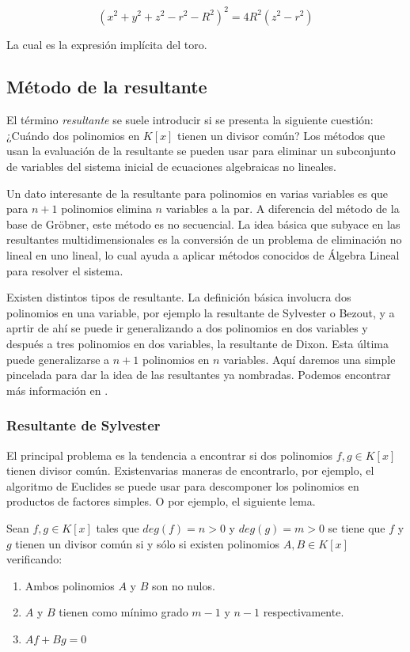 $$(x^2 + y^2 + z^2 - r^2 - R^2)^2 = 4 R^2 (z^2 - r^2)$$

La cual es la expresión implícita del toro.

\subsection{Método de la resultante}

El término { \em resultante} se suele introducir si se presenta la siguiente cuestión: ¿Cuándo dos polinomios en $K[x]$ tienen un divisor común? Los métodos que usan la evaluación de la resultante se pueden usar para eliminar un subconjunto de variables del sistema inicial de ecuaciones algebraicas no lineales.
\par Un dato interesante de la resultante para polinomios en varias variables es que para $n+1$ polinomios elimina $n$ variables a la par. A diferencia del método de la base de Gröbner, este método es no secuencial. La idea básica que subyace en las resultantes multidimensionales es la conversión de un problema de eliminación no lineal en uno lineal, lo cual ayuda a aplicar métodos conocidos de Álgebra Lineal para resolver el sistema.
\par Existen distintos tipos de resultante. La definición básica involucra dos polinomios en una variable, por ejemplo la resultante de Sylvester o Bezout, y a aprtir de ahí se puede ir generalizando a dos polinomios en dos variables y después a tres polinomios en dos variables, la resultante de Dixon. Esta última puede generalizarse a $n+1$ polinomios en $n$ variables. Aquí daremos una simple pincelada para dar la idea de las resultantes ya nombradas. Podemos encontrar más información en \cite{Berchtold00}.

\subsubsection*{Resultante de Sylvester}

El principal problema es la tendencia a encontrar si dos polinomios $f, g \in K[x]$ tienen divisor común. Existenvarias maneras de encontrarlo, por ejemplo, el algoritmo de Euclides se puede usar para descomponer los polinomios en productos de factores simples. O por ejemplo, el siguiente lema.

\begin{lemma}
	Sean $f,g \in K[x]$ tales que $deg(f) = n > 0$ y $deg(g) = m > 0$ se tiene que $f$ y $g$ tienen un divisor común si y sólo si existen polinomios $A, B \in K[x]$ verificando:
	\begin{enumerate}
		\item Ambos polinomios $A$ y $B$ son no nulos.
		\item $A$ y $B$ tienen como mínimo grado $m-1$ y $n-1$ respectivamente.
		\item $Af + Bg = 0$
	\end{enumerate}
\end{lemma}

